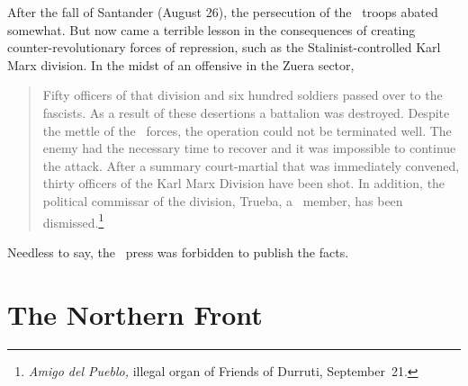 After the fall of Santander (August 26), the persecution of the \CNT\ troops abated somewhat. But now came a terrible lesson in the consequences of creating counter-revolutionary forces of repression, such as the Stalinist-controlled Karl Marx division. In the midst of an offensive in the Zuera sector,

\indexCNT\indexPSUC{}
\begin{quotation}
  Fifty officers of that division and six hundred soldiers pass\-ed over to the fascists. As a result of these desertions a battalion was destroyed. Despite the mettle of the \CNT\ forces, the operation could not be terminated well. The enemy had the necessary time to recover and it was impossible to continue the attack. After a summary court-martial that was immediately convened, thirty officers of the Karl Marx Division have been shot. In addition, the political commissar of the division, Trueba, a \PSUC\ member, has been dismissed.\footnote{\emph{Amigo del Pueblo,} illegal organ of Friends of Durruti, September~21.}
\end{quotation}

Needless to say, the \CNT\ press was forbidden to publish the facts.

\section{The Northern Front}




